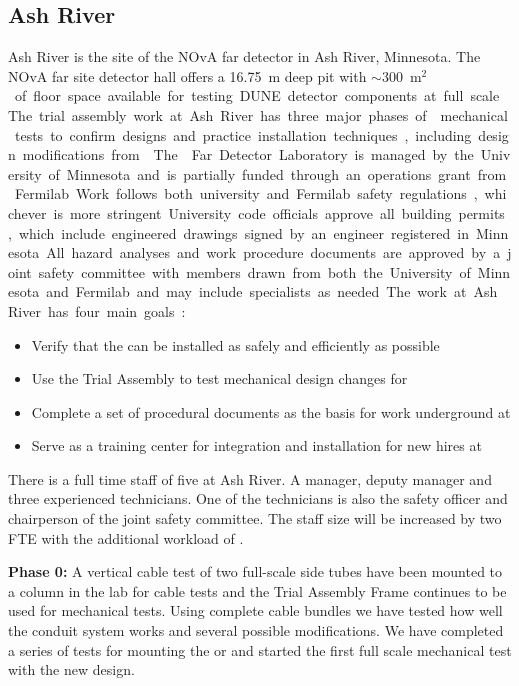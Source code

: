 \subsection{Ash River}

Ash River is the site of the NOvA far detector in Ash River,
Minnesota. The NOvA far site detector hall offers a \SI{16.75}{m} deep
pit with $\sim$\SI{300}{m$^2$} of floor space available for testing
DUNE detector components at full scale.  The trial assembly work at
Ash River has three major phases of  mechanical tests to
confirm designs and practice installation techniques, including design
modifications from .  The  Far Detector
Laboratory is managed by the University of Minnesota and is partially
funded through an operations grant from Fermilab.  Work follows both
university and Fermilab safety regulations, whichever is more
stringent. University code officials approve all building
permits, which include engineered drawings signed by an engineer
registered in Minnesota. All hazard analyses and work procedure
documents are approved by a joint safety committee with members drawn
from both the University of Minnesota and Fermilab and may include
specialists as needed.

The work at Ash River has four main goals:
\begin{itemize}
  \item Verify that the   can be installed as
    safely and efficiently as possible
  \item Use the  Trial Assembly  to test
    mechanical design changes for 
  \item Complete a set of procedural documents as the basis for work
    underground at \surf
  \item Serve as a training center for  integration and
      installation for new hires at \surf
\end{itemize}

There is a full time staff of five  at Ash River. A
manager, deputy manager and three experienced technicians.  One of the
technicians is also the safety officer and chairperson of the joint
safety committee. The staff size will be increased by two FTE with the
additional workload of .

{\bf Phase 0:} A vertical cable test of two full-scale 
side tubes have been mounted to a column in the lab for cable tests
and the  Trial Assembly Frame continues to be used
for  mechanical tests. Using complete cable
bundles we have tested how well the conduit system works and several
possible modifications. We have completed a series of tests for
mounting the  or  and started the first
full scale mechanical  test with the new design.


